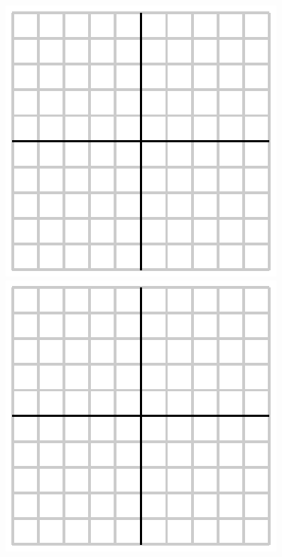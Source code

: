 \documentclass[12pt]{article}
\begin{document}
\begin{enumerate}
  \begin{center}
    \includegraphics{empty.eps}
    \hspace*{24pt}
    \includegraphics{empty.eps}
  \end{center}
  
  

\end{enumerate}
\end{document}
